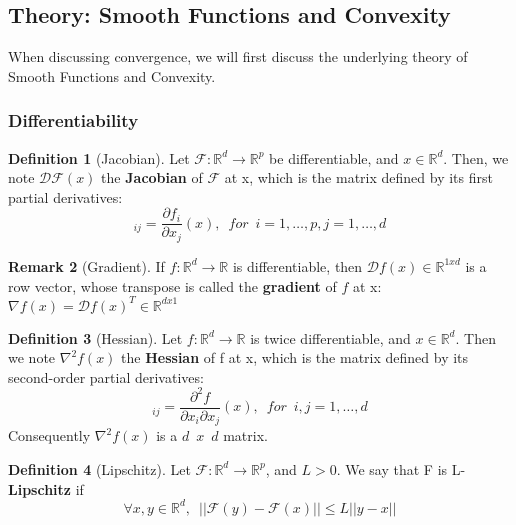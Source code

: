 \subsection{Theory: Smooth Functions and Convexity}
When discussing convergence, we will first discuss the underlying theory of Smooth Functions and Convexity. 

\subsubsection{Differentiability}

\textbf{Definition 1} (Jacobian). Let $\mathcal{F}: \mathbb{R}^d \rightarrow \mathbb{R}^p$ be differentiable, and $x \in \mathbb{R}^d$. Then, we note $\mathcal{D}\mathcal{F}(x)$ the \textbf{Jacobian} of $\mathcal{F}$ at x, which is the matrix defined by its first partial derivatives: \newline 
\begin{equation}
    [\mathcal{D}\mathcal{F}(x)]_{ij} = \frac{\partial{f_i}}{\partial{x_j}}(x), \enspace for \enspace i = 1, \dots, p, j = 1, \dots, d
\end{equation}

\noindent \textbf{Remark 2} (Gradient). If $f: \mathbb{R}^d \rightarrow \mathbb{R}$ is differentiable, then $\mathcal{D}f(x) \in \mathbb{R}^{1 x d}$ is a row vector, whose transpose is called the \textbf{gradient} of $f$ at x: $\nabla f(x) = \mathcal{D} f(x)^T \in \mathbb{R}^{d x 1}$ \newline 

\noindent \textbf{Definition 3} (Hessian). Let $f: \mathbb{R}^d \rightarrow \mathbb{R}$ is twice differentiable, and $x \in \mathbb{R}^d$. Then we note $\nabla^2 f(x)$ the \textbf{Hessian} of f at x, which is the matrix defined by its second-order partial derivatives:
\begin{equation}
    [\nabla^2 f(x)]_{ij} = \frac{\partial^2{f}}{\partial{x_i}\partial{x_j}}(x), \enspace for \enspace i, j = 1, \dots, d
\end{equation}
Consequently $\nabla^2 f(x)$ is a $d \enspace x \enspace d$ matrix. 

\noindent \textbf{Definition 4} (Lipschitz). Let $\mathcal{F}: \mathbb{R}^d \rightarrow \mathbb{R}^p$, and $L > 0$. We say that F is L-\textbf{Lipschitz} if
\begin{equation}
    \forall x, y \in \mathbb{R}^d, \enspace ||\mathcal{F}(y) - \mathcal{F}(x)|| \leq L ||y - x||
\end{equation}

